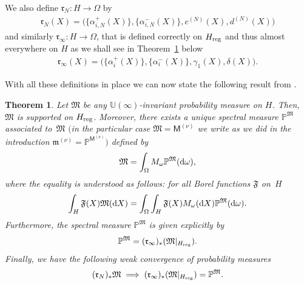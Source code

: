 \documentclass[pdftex]{sigma}
\numberwithin{equation}{section}
\newtheorem{Theorem}{Theorem}[section]
\begin{document}
We also define $\mathfrak{r}_N\colon H \to \Omega$ by
\begin{gather*}
\mathfrak{r}_N(X)=\big(\big\{\alpha_{i,N}^{+}(X)\big\}, \big\{\alpha_{i,N}^{-}(X)\big\}, c^{(N)}(X), d^{(N)}(X)\big)
\end{gather*}
and similarly $\mathfrak{r}_{\infty}\colon H \to \Omega$, that is defined correctly on $H_{{\rm reg}}$ and thus almost everywhere on $H$ as we shall see in Theorem~\ref{ErgodicMethodTheorem} below
\begin{gather*}
\mathfrak{r}_\infty(X)=\big(\big\{\alpha_{i}^{+}(X)\big\}, \big\{\alpha_{i}^{-}(X)\big\}, \gamma_1(X), \delta(X)\big).
\end{gather*}

With all these definitions in place we can now state the following result from \cite[Section 5]{BorodinOlshanskiErgodic}.

\begin{Theorem}\label{ErgodicMethodTheorem}Let $\mathfrak{M}$ be any $\mathbb{U}(\infty)$-invariant probability measure on $H$. Then, $\mathfrak{M}$ is supported on $H_{{\rm reg}}$. Moreover, there exists a unique spectral measure $\mathbb{P}^{\mathfrak{M}}$ associated to~$\mathfrak{M}$ $($in the particular case $\mathfrak{M}=\mathsf{M}^{(\nu)}$ we write as we did in the introduction $\mathfrak{m}^{(\nu)}=\mathbb{P}^{\mathsf{M}^{(\nu)}})$ defined by
\begin{gather*}
\mathfrak{M}=\int_{\Omega}^{}M_{\omega} \mathbb{P}^{\mathfrak{M}}({\rm d}\omega),
\end{gather*}
where the equality is understood as follows: for all Borel functions $\mathfrak{F}$ on~$H$
\begin{gather*}
\int_{H}^{}\mathfrak{F}(X)\mathfrak{M}({\rm d}X)=\int_{\Omega}^{}\int_{H}^{}\mathfrak{F}(X)M_{\omega}({\rm d}X)\mathbb{P}^{\mathfrak{M}}({\rm d}\omega).
\end{gather*}
Furthermore, the spectral measure $\mathbb{P}^{\mathfrak{M}}$ is given explicitly by
\begin{gather*}
\mathbb{P}^{\mathfrak{M}}= (\mathfrak{r}_{\infty} )_* (\mathfrak{M}|_{H_{{\rm reg}}} ).
\end{gather*}
Finally, we have the following weak convergence of probability measures
\begin{gather*}
 (\mathfrak{r}_N )_* \mathfrak{M} \implies (\mathfrak{r}_{\infty} )_* (\mathfrak{M}|_{H_{{\rm reg}}} )=\mathbb{P}^{\mathfrak{M}}.
\end{gather*}
\end{Theorem}
\end{document}
